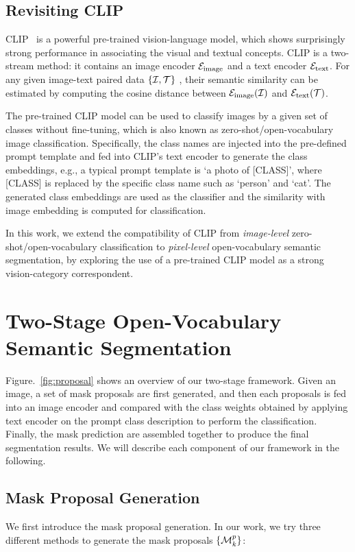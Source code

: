 \documentclass[runningheads]{llncs}
\begin{document}
\subsection{Revisiting CLIP}
CLIP~\cite{radford2021learning} is a powerful pre-trained vision-language model, which shows surprisingly strong performance in associating the visual and textual concepts. CLIP is a two-stream method: it contains an image encoder ${\cal E}_{\text{image}}$ and a text encoder ${\cal E}_{\text{text}}$. For any given image-text paired data $\{{\cal I}, {\cal T}\}$ , their semantic similarity can be estimated by computing the cosine distance between ${\cal E}_{\text{image}}({\cal I})$ and ${\cal E}_{\text{text}}({\cal T})$. 

The pre-trained CLIP model can be used to classify images by a given set of classes without fine-tuning, which is also known as zero-shot/open-vocabulary image classification. Specifically, the class names are injected into the pre-defined prompt template and fed into CLIP's text encoder to generate the class embeddings, e.g., a typical prompt template is `a photo of [CLASS]', where [CLASS] is replaced by the specific class name such as `person' and `cat'. The generated class embeddings are used as the classifier and the similarity with image embedding is computed for classification. 

In this work, we extend the compatibility of CLIP from \textit{image-level} zero-shot/open-vocabulary classification to \textit{pixel-level} open-vocabulary semantic segmentation, by exploring the use of a pre-trained CLIP model as a strong vision-category correspondent.


\section{Two-Stage Open-Vocabulary Semantic Segmentation}
Figure.~\ref{fig:proposal} shows an overview of our two-stage framework. Given an image, a set of mask proposals are first generated, and then each proposals is fed into an image encoder and compared with the class weights obtained by applying text encoder on the prompt class description to perform the classification. Finally, the mask prediction are assembled together to produce the final segmentation results. We will describe each component of our framework in the following.


\subsection{Mask Proposal Generation}
\label{sec:mask_proposal_generation}
We first introduce the mask proposal generation. In our work, we try three different methods to generate the mask proposals $\{{\cal M}^{p}_{k}\}$:
\end{document}
